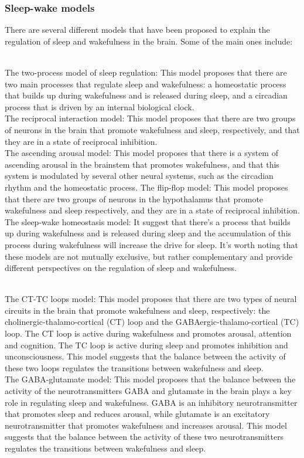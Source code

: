 \begin{itemize}
\begin{itemize}
\subsubsection{Sleep-wake models}
There are several different models that have been proposed to explain the regulation of sleep and wakefulness in the brain. Some of the main ones include:

\\The two-process model of sleep regulation: This model proposes that there are two main processes that regulate sleep and wakefulness: a homeostatic process that builds up during wakefulness and is released during sleep, and a circadian process that is driven by an internal biological clock.
\\The reciprocal interaction model: This model proposes that there are two groups of neurons in the brain that promote wakefulness and sleep, respectively, and that they are in a state of reciprocal inhibition.
\\The ascending arousal model: This model proposes that there is a system of ascending arousal in the brainstem that promotes wakefulness, and that this system is modulated by several other neural systems, such as the circadian rhythm and the homeostatic process.
The flip-flop model: This model proposes that there are two groups of neurons in the hypothalamus that promote wakefulness and sleep respectively, and they are in a state of reciprocal inhibition.
\\The sleep-wake homeostasis model: It suggest that there's a process that builds up during wakefulness and is released during sleep and the accumulation of this process during wakefulness will increase the drive for sleep.
It's worth noting that these models are not mutually exclusive, but rather complementary and provide different perspectives on the regulation of sleep and wakefulness.

\\The CT-TC loops model: This model proposes that there are two types of neural circuits in the brain that promote wakefulness and sleep, respectively: the cholinergic-thalamo-cortical (CT) loop and the GABAergic-thalamo-cortical (TC) loop. The CT loop is active during wakefulness and promotes arousal, attention and cognition. The TC loop is active during sleep and promotes inhibition and unconsciousness. This model suggests that the balance between the activity of these two loops regulates the transitions between wakefulness and sleep.
\\The GABA-glutamate model: This model proposes that the balance between the activity of the neurotransmitters GABA and glutamate in the brain plays a key role in regulating sleep and wakefulness. GABA is an inhibitory neurotransmitter that promotes sleep and reduces arousal, while glutamate is an excitatory neurotransmitter that promotes wakefulness and increases arousal. This model suggests that the balance between the activity of these two neurotransmitters regulates the transitions between wakefulness and sleep.

\end{itemize}
\end{itemize}
